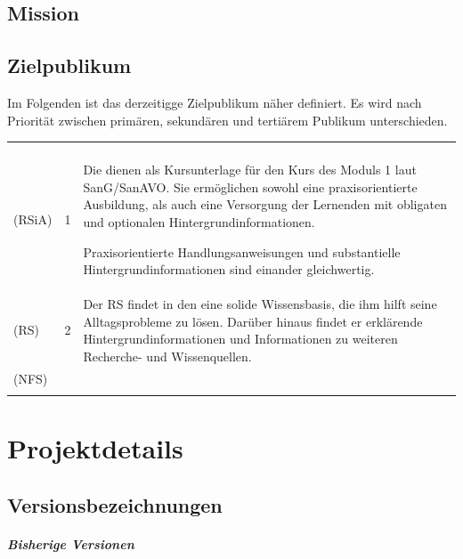\documentclass[ngerman,paper=a4,fontsize=8pt,headings=small,draft=no,parskip=half,noonelinecaption]{scrreprt}
\begin{document}
    
    



\section{Mission}

\section{Zielpublikum}

Im Folgenden ist das derzeitigge Zielpublikum näher definiert. Es wird
nach Priorität zwischen primären, sekundären und tertiärem Publikum
unterschieden.

\begin{tabulary}{\linewidth}{LLL}
\toprule\addlinespace
{}
&
&
\\\addlinespace\midrule\addlinespace
{} (RSiA)
&
1
&
Die \AASS{} dienen als Kursunterlage für den Kurs des Moduls 1 laut
SanG/SanAVO. Sie ermöglichen sowohl eine praxisorientierte Ausbildung, als auch
eine Versorgung der Lernenden mit obligaten und optionalen
Hintergrundinformationen.

Praxisorientierte Handlungsanweisungen und substantielle
Hintergrundinformationen sind einander gleichwertig. 
\\\addlinespace
{} (RS) & 2
&
Der RS findet in den \AASS{} eine solide Wissensbasis, die ihm hilft seine
Alltagsprobleme zu lösen. Darüber hinaus findet er erklärende
Hintergrundinformationen und Informationen zu weiteren Recherche- und
Wissenquellen. 
\\\addlinespace {} (NFS) &

&


\\\addlinespace\bottomrule
\end{tabulary}




\chapter{Projektdetails}

\section{Versionsbezeichnungen}

\paragraph{Bisherige Versionen}~
\end{document}
